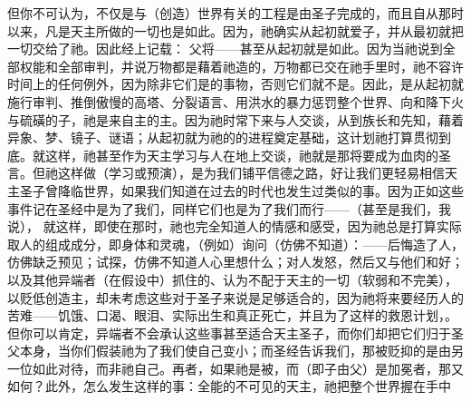 但你不可认为，不仅是与（创造）世界有关的工程是由圣子完成的，而且自从那时以来，凡是天主所做的一切也是如此。因为，祂确实从起初就爱子，并从最初就把一切交给了祂。因此经上记载： 父将——甚至从起初就是如此。因为当祂说到全部权能和全部审判，并说万物都是藉着祂造的，万物都已交在祂手里时，祂不容许时间上的任何例外，因为除非它们是的事物，否则它们就不是。因此，是从起初就施行审判、推倒傲慢的高塔、分裂语言、用洪水的暴力惩罚整个世界、向和降下火与硫磺的子，祂是来自主的主。因为祂时常下来与人交谈，从到族长和先知，藉着异象、梦、镜子、谜语；从起初就为祂的的进程奠定基础，这计划祂打算贯彻到底。就这样，祂甚至作为天主学习与人在地上交谈，祂就是那将要成为血肉的圣言。但祂这样做（学习或预演），是为我们铺平信德之路，好让我们更轻易相信天主圣子曾降临世界，如果我们知道在过去的时代也发生过类似的事。因为正如这些事件记在圣经中是为了我们，同样它们也是为了我们而行——（甚至是我们，我说）， 就这样，即使在那时，祂也完全知道人的情感和感受，因为祂总是打算实际取人的组成成分，即身体和灵魂，（例如）询问（仿佛不知道）：——后悔造了人，仿佛缺乏预见；试探，仿佛不知道人心里想什么；对人发怒，然后又与他们和好；以及其他异端者（在假设中）抓住的、认为不配于天主的一切（软弱和不完美），以贬低创造主，却未考虑这些对于圣子来说是足够适合的，因为祂将来要经历人的苦难——饥饿、口渴、眼泪、实际出生和真正死亡，并且为了这样的救恩计划，。但你可以肯定，异端者不会承认这些事甚至适合天主圣子，而你们却把它们归于圣父本身，当你们假装祂为了我们使自己变小；而圣经告诉我们，那被贬抑的是由另一位如此对待，而非祂自己。再者，如果祂是被，而（即子由父）是加冕者，那又如何？此外，怎么发生这样的事：全能的不可见的天主，祂把整个世界握在手中 